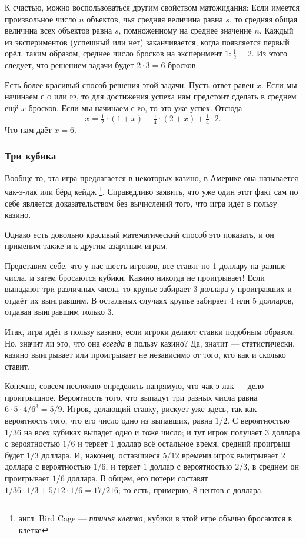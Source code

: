 К счастью, можно воспользоваться другим свойством матожидания:
Если имеется произвольное число $n$ объектов, чья средняя величина равна $s$, то средняя общая величина всех объектов равна $s$, помноженному на среднее значение $n$.
Каждый из экспериментов (успешный или нет) заканчивается, когда появляется первый орёл, таким образом, среднее число бросков на эксперимент $1:\tfrac12=2$.
Из этого следует, что
решением задачи будет $2{\cdot}3=6$ бросков.\heart

Есть более красивый способ решения этой задачи.
Пусть ответ равен $x$.
Если мы начинаем с \textsc{о} или \textsc{рр}, то для достижения успеха нам предстоит сделать в среднем ещё $x$ бросков.
Если мы начинаем с \textsc{ро}, то это уже успех.
Отсюда
\[x=\tfrac12 \cdot(1+x)+\tfrac14 \cdot(2+x)+\tfrac14 \cdot2.\]
Что нам даёт $x=6$.

\subsubsection*{Три кубика}%

Вообще-то, эта игра предлагается в некоторых казино, в Америке она называется чак-э-лак или бёрд кейдж%
\footnote{англ. Bird Cage --- \emph{птичья клетка}; кубики в этой игре обычно бросаются в клетке}. 
Справедливо заявить, что уже один этот факт сам по себе является доказательством без вычислений того, что игра идёт в пользу казино.

Однако есть довольно красивый математический способ это показать, и он применим также и к другим азартным играм.

\medskip

Представим себе, что у нас шесть игроков, все ставят по 1 доллару на разные числа, и затем бросаются кубики.
Казино никогда не проигрывает!
Если выпадают три различных числа, то крупье забирает 3 доллара у проигравших и отдаёт их выигравшим.
В остальных случаях крупье забирает 4 или 5 долларов, отдавая выигравшим только 3.
\heart

Итак, игра идёт в пользу казино, если игроки делают ставки подобным образом.
Но, значит ли это, что она \emph{всегда} в пользу казино?
Да, значит --- статистически, казино выигрывает или проигрывает не независимо от того, кто как и сколько ставит.

Конечно, совсем несложно определить напрямую, что чак-э-лак --- дело проигрышное.
Вероятность того, что выпадут три разных числа равна $6{\cdot}5{\cdot}4/6^3=5/9$.
Игрок, делающий ставку, рискует уже здесь, так как вероятность того, что его число одно из выпавших, равна $1/2$.
С вероятностью $1/36$ на всех кубиках выпадет одно и тоже число;
и тут игрок получает $3$ доллара с вероятностью $1/6$ и теряет 1 доллар всё остальное время, средний проигрыш будет $1/3$ доллара.
И, наконец, оставшиеся $5/12$ времени игрок выигрывает $2$ доллара с вероятностью $1/6$, и теряет $1$ доллар с вероятностью $2/3$, в среднем он проигрывает $1/6$ доллара.
В общем, его потери составят $1/36{\cdot}1/3 + 5/12{\cdot}1/6 = 17/216$; то есть, примерно, $8$ центов с доллара.

